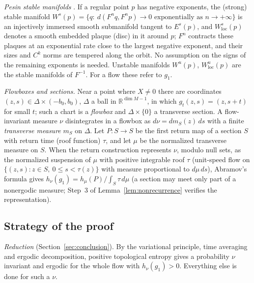 \documentclass[12pt]{article}
\theoremstyle{remark}
\newcommand{\R}{\mathbb R}
\begin{document}
\emph{Pesin stable manifolds} \cite{Pesin1976}.  If a regular point
\(p\) has negative exponents, the (strong) stable manifold
\(W^s(p)=\{q:\ d(F^nq,F^np)\to0\text{ exponentially as }n\to+\infty\}\)
is an injectively immersed smooth submanifold tangent to
\(E^s(p)\), and \(W^s_{\mathrm{loc}}(p)\) denotes a smooth embedded
plaque (disc) in it around \(p\); \(F^n\) contracts these plaques at
an exponential rate close to the largest negative exponent, and their
sizes and \(C^k\) norms are tempered along the orbit.  No assumption
on the signs of the remaining exponents is needed.
Unstable manifolds \(W^u(p)\), \(W^u_{\mathrm{loc}}(p)\) are the
stable manifolds of \(F^{-1}\).  For a flow these refer to
\(g_1\).

\emph{Flowboxes and sections.}  Near a point where \(X\ne0\) there
are coordinates \((z,s)\in \Delta\times(-b_0,b_0)\), \(\Delta\) a ball in
\(\R^{\dim M-1}\), in which \(g_t(z,s)=(z,s+t)\) for small \(t\); such
a chart is a \emph{flowbox} and \(\Delta\times\{0\}\) a transverse
section.  A flow-invariant measure \(\nu\) disintegrates in a flowbox
as \(d\nu=dm_S(z)\,ds\) with a finite \emph{transverse measure}
\(m_S\) on \(\Delta\).  Let \(P:S\to S\) be the first return map of a
section \(S\) with return time (roof function) \(\tau\), and let
\(\mu\) be the normalized transverse measure on \(S\).  When the
return construction represents \(\nu\), modulo null sets, as the
normalized suspension of \(\mu\) with positive integrable roof
\(\tau\) (unit-speed flow on \(\{(z,s):z\in S,\ 0\le s<\tau(z)\}\)
with measure proportional to \(d\mu\,ds\)), Abramov's formula
\cite{Abramov1959} gives
\(h_\nu(g_1)=h_\mu(P)/\int_S\tau\,d\mu\) (a section may meet only part
of a nonergodic measure; Step~3 of Lemma~\ref{lem:nonrecurrence}
verifies the representation).

\subsection{Strategy of the proof}
\label{sec:strategy}

\emph{Reduction} (Section~\ref{sec:conclusion}).
By the variational principle, time averaging and ergodic
decomposition, positive topological entropy gives a probability
\(\nu\) invariant and ergodic for the whole flow with
\(h_\nu(g_1)>0\).  Everything else is done for such a \(\nu\).
\end{document}
